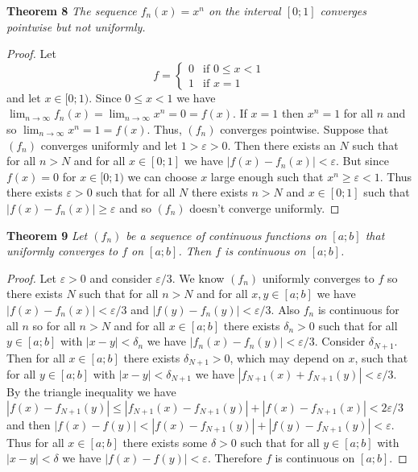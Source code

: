 \documentclass{article}
\begin{document}
\begin{flushleft}
\textbf{Theorem 8}
\textsl{The sequence $f_n(x) = x^n$ on the interval $[0;1]$ converges pointwise but not uniformly.}
\begin{proof}
Let
\[
f=
\begin{cases}
0 & \text{if $0 \leq x < 1$}\\
1 & \text{if $x=1$}
\end{cases}
\]
and let $x \in [0;1)$. Since $0 \leq x < 1$ we have $\lim_{n \rightarrow \infty} f_n(x) = \lim_{n \rightarrow \infty} x^n = 0 = f(x)$. If $x=1$ then $x^n = 1$ for all $n$ and so $\lim_{n \rightarrow \infty} x^n = 1 = f(x)$. Thus, $(f_n)$ converges pointwise. Suppose that $(f_n)$ converges uniformly and let $1 > \varepsilon > 0$. Then there exists an $N$ such that for all $n>N$ and for all $x \in [0;1]$ we have $|f(x)-f_n(x)| < \varepsilon$. But since $f(x) = 0$ for $x \in [0;1)$ we can choose $x$ large enough such that $x^n \geq \varepsilon < 1$. Thus there exists $\varepsilon > 0$ such that for all $N$ there exists $n>N$ and $x \in [0;1]$ such that $|f(x) - f_n(x)| \geq \varepsilon$ and so $(f_n)$ doesn't converge uniformly.
\end{proof}

\textbf{Theorem 9}
\textsl{Let $(f_n)$ be a sequence of continuous functions on $[a;b]$ that uniformly converges to $f$ on $[a;b]$. Then $f$ is continuous on $[a;b]$.}
\begin{proof}
Let $\varepsilon > 0$ and consider $\varepsilon/3$. We know $(f_n)$ uniformly converges to $f$ so there exists $N$ such that for all $n>N$ and for all $x,y \in [a;b]$ we have $|f(x)-f_n(x)| < \varepsilon/3$ and $|f(y)-f_n(y)| < \varepsilon/3$. Also $f_n$ is continuous for all $n$ so for all $n>N$ and for all $x \in [a;b]$ there exists $\delta_n > 0$ such that for all $y \in [a;b]$ with $|x-y| < \delta_n$ we have $|f_n(x) - f_n(y)| < \varepsilon/3$. Consider $\delta_{N+1}$. Then for all $x \in [a;b]$ there exists $\delta_{N+1} > 0$, which may depend on $x$, such that for all $y \in [a;b]$ with $|x-y| < \delta_{N+1}$ we have $|f_{N+1}(x)+f_{N+1}(y)| < \varepsilon/3$. By the triangle inequality we have $|f(x)-f_{N+1}(y)| \leq |f_{N+1}(x)-f_{N+1}(y)| + |f(x)-f_{N+1}(x)| < 2\varepsilon/3$ and then $|f(x)-f(y)| < |f(x)-f_{N+1}(y)| + |f(y)-f_{N+1}(y)| < \varepsilon$. Thus for all $x \in [a;b]$ there exists some $\delta > 0$ such that for all $y \in [a;b]$ with $|x-y| < \delta$ we have $|f(x)-f(y)| < \varepsilon$. Therefore $f$ is continuous on $[a;b]$.
\end{proof}

\end{flushleft}
\end{document}
